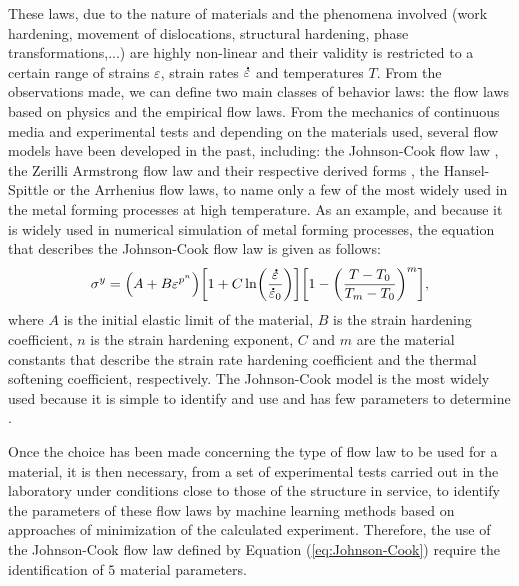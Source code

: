 \documentclass[algorithms,article,submit,pdftex,moreauthors]{Definitions/mdpi}
\DeclareRobustCommand{\mdot}[1]{\accentset{\mbox{\bfseries .}}{#1}}
\begin{document}
These laws, due to the nature of materials and the phenomena involved \cite{Lennon-2004, Zhang-2012} (work hardening, movement of dislocations, structural hardening, phase transformations,...) are highly non-linear and their validity is restricted to a certain range of strains $\varepsilon$, strain rates $\mdot\varepsilon$ and temperatures $T$.
From the observations made, we can define two main classes of behavior laws: the flow laws based on physics and the empirical flow laws.
From the mechanics of continuous media and experimental tests and depending on the materials used, several flow models have been developed in the past, including: the Johnson-Cook flow law \cite{Johnson-1983, Johnson-1988}, the Zerilli Armstrong flow law \cite{Zerilli-1987} and their respective derived forms \cite{Lin-2011, Li-2013, Zhang-2015, Zhou-2020, Jia-2021, Rule-1998, Lin2010, Muralli-2017, Cheng-2021}, the Hansel-Spittle \cite{Hensel-1978, Chadha-2018} or the Arrhenius \cite{Jonas-1969, He-2013, Liang-2022} flow laws, to name only a few of the most widely used in the metal forming processes at high temperature.
As an example, and because it is widely used in numerical simulation of metal forming processes, the equation that describes the Johnson-Cook flow law \cite{Johnson-1983} is given as follows:
\begin{equation}
\sigma^y=\left(A+B\varepsilon^{p^{n}}\right) \left[1+C\ln\left(\frac{\mdot\varepsilon}{\mdot\varepsilon_0}\right)\right] \left[1-\left(\frac{T-T_0}{T_m-T_0}\right)^{m}\right],\label{eq:Johnson-Cook}
\end{equation}
where $A$ is the initial elastic limit of the material, $B$ is the strain hardening coefficient, $n$ is the strain hardening exponent, $C$ and $m$ are the material constants that describe the strain rate hardening coefficient and the thermal softening coefficient, respectively.
The Johnson-Cook model is the most widely used because it is simple to identify and use and has few parameters to determine \cite{NematNasser-2003, Khan-2004}.

Once the choice has been made concerning the type of flow law to be used for a material, it is then necessary, from a set of experimental tests carried out in the laboratory under conditions close to those of the structure in service, to identify the parameters of these flow laws by machine learning methods based on approaches of minimization of the calculated experiment.
Therefore, the use of the Johnson-Cook flow law defined by Equation (\ref{eq:Johnson-Cook}) require the identification of $5$ material parameters.
\end{document}
